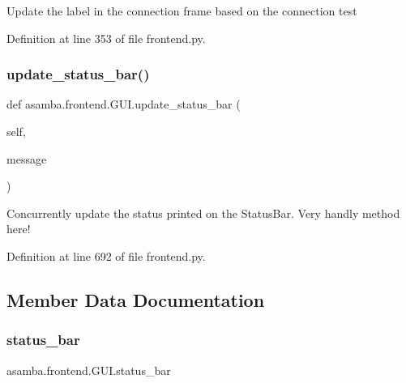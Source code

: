 \begin{DoxyVerb}Update the label in the connection frame based on the connection test \end{DoxyVerb}
 

Definition at line 353 of file frontend.\+py.

\mbox{\label{classasamba_1_1frontend_1_1_g_u_i_a9b882f15d916eb942b202888fa29cf12}} 
\subsubsection{\texorpdfstring{update\+\_\+status\+\_\+bar()}{update\_status\_bar()}}
{\footnotesize\ttfamily def asamba.\+frontend.\+G\+U\+I.\+update\+\_\+status\+\_\+bar (\begin{DoxyParamCaption}\item[{}]{self,  }\item[{}]{message }\end{DoxyParamCaption})}

\begin{DoxyVerb}Concurrently update the status printed on the StatusBar. Very handly method here! \end{DoxyVerb}
 

Definition at line 692 of file frontend.\+py.



\subsection{Member Data Documentation}
\mbox{\label{classasamba_1_1frontend_1_1_g_u_i_a05a2765e23aaed2a4380f7089f387dbd}} 
\subsubsection{\texorpdfstring{status\+\_\+bar}{status\_bar}}
{\footnotesize\ttfamily asamba.\+frontend.\+G\+U\+I.\+status\+\_\+bar}



